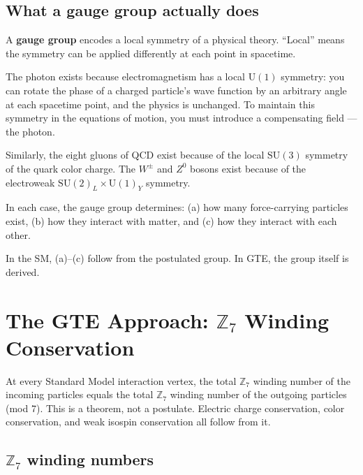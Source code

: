 \documentclass[11pt,a4paper]{article}
\newcommand{\term}[1]{\textbf{#1}}
\begin{document}
\subsection{What a gauge group actually does}

A \term{gauge group} encodes a local symmetry of a physical theory.
``Local'' means the symmetry can be applied differently at each point in spacetime.

The photon exists because electromagnetism has a local $\mathrm{U}(1)$ symmetry:
you can rotate the phase of a charged particle's wave function by an arbitrary
angle at each spacetime point, and the physics is unchanged.
To maintain this symmetry in the equations of motion, you must introduce a
compensating field --- the photon.

Similarly, the eight gluons of QCD exist because of the local $\mathrm{SU}(3)$
symmetry of the quark color charge.
The $W^{\pm}$ and $Z^0$ bosons exist because of the electroweak $\mathrm{SU}(2)_L
\times \mathrm{U}(1)_Y$ symmetry.

In each case, the gauge group determines:
(a) how many force-carrying particles exist,
(b) how they interact with matter, and
(c) how they interact with each other.

In the SM, (a)--(c) follow from the postulated group.
In GTE, the group itself is derived.

\section{The GTE Approach: $\mathbb{Z}_7$ Winding Conservation}
\label{sec:z7}

\begin{tcolorbox}[colback=boxgreen,colframe=green!50!black,
  title=The key structural fact]
At every Standard Model interaction vertex, the total $\mathbb{Z}_7$
winding number of the incoming particles equals the total $\mathbb{Z}_7$
winding number of the outgoing particles (mod 7).
This is a theorem, not a postulate.
Electric charge conservation, color conservation, and weak isospin
conservation all follow from it.
\end{tcolorbox}

\subsection{$\mathbb{Z}_7$ winding numbers}
\end{document}
